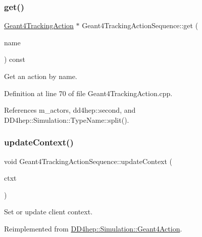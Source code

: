 \subsubsection{\texorpdfstring{get()}{get()}}
{\footnotesize\ttfamily \hyperlink{class_d_d4hep_1_1_simulation_1_1_geant4_tracking_action}{Geant4\+Tracking\+Action} $\ast$ Geant4\+Tracking\+Action\+Sequence\+::get (\begin{DoxyParamCaption}\item[{const std\+::string \&}]{name }\end{DoxyParamCaption}) const}



Get an action by name. 



Definition at line 70 of file Geant4\+Tracking\+Action.\+cpp.



References m\+\_\+actors, dd4hep\+::second, and D\+D4hep\+::\+Simulation\+::\+Type\+Name\+::split().

\hypertarget{class_d_d4hep_1_1_simulation_1_1_geant4_tracking_action_sequence_a7afac2362f030a76e39cbdc7ab5b0ee7}{}\label{class_d_d4hep_1_1_simulation_1_1_geant4_tracking_action_sequence_a7afac2362f030a76e39cbdc7ab5b0ee7} 
\subsubsection{\texorpdfstring{update\+Context()}{updateContext()}}
{\footnotesize\ttfamily void Geant4\+Tracking\+Action\+Sequence\+::update\+Context (\begin{DoxyParamCaption}\item[{\hyperlink{class_d_d4hep_1_1_simulation_1_1_geant4_context}{Geant4\+Context} $\ast$}]{ctxt }\end{DoxyParamCaption})\hspace{0.3cm}{\ttfamily [virtual]}}



Set or update client context. 



Reimplemented from \hyperlink{class_d_d4hep_1_1_simulation_1_1_geant4_action_ae3b9daf2af881df956c46568c0743313}{D\+D4hep\+::\+Simulation\+::\+Geant4\+Action}.



